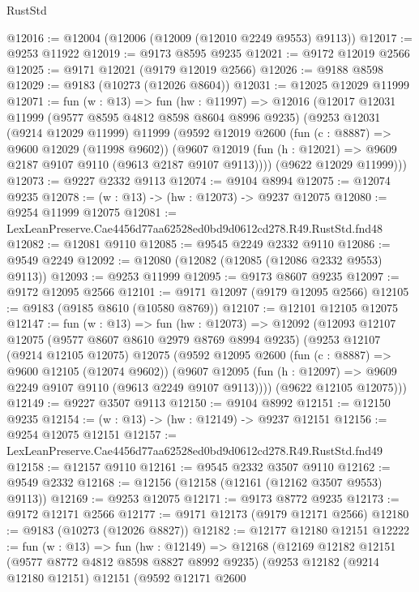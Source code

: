 \begin{lexlean}{RustStd}
\begin{coremodule}
@12016 := @12004 (@12006 (@12009 (@12010 @2249 @9553) @9113))
@12017 := @9253 @11922
@12019 := @9173 @8595 @9235
@12021 := @9172 @12019 @2566
@12025 := @9171 @12021 (@9179 @12019 @2566)
@12026 := @9188 @8598
@12029 := @9183 (@10273 (@12026 @8604))
@12031 := @12025 @12029 @11999
@12071 := fun (w : @13) =>
  fun (hw : @11997) =>
  @12016
    (@12017
      @12031
      @11999
      (@9577 @8595 @4812 @8598 @8604 @8996 @9235)
      (@9253
        @12031
        (@9214 @12029 @11999)
        @11999
        (@9592
          @12019
          @2600
          (fun (c : @8887) => @9600 @12029 (@11998 @9602))
          (@9607 @12019 (fun (h : @12021) => @9609 @2187 @9107 @9110 (@9613 @2187 @9107 @9113))))
        (@9622 @12029 @11999)))
@12073 := @9227 @2332 @9113
@12074 := @9104 @8994
@12075 := @12074 @9235
@12078 := (w : @13) -> (hw : @12073) -> @9237 @12075
@12080 := @9254 @11999 @12075
@12081 := LexLeanPreserve.Cae4456d77aa62528ed0bd9d0612cd278.R49.RustStd.fnd48
@12082 := @12081 @9110
@12085 := @9545 @2249 @2332 @9110
@12086 := @9549 @2249
@12092 := @12080 (@12082 (@12085 (@12086 @2332 @9553) @9113))
@12093 := @9253 @11999
@12095 := @9173 @8607 @9235
@12097 := @9172 @12095 @2566
@12101 := @9171 @12097 (@9179 @12095 @2566)
@12105 := @9183 (@9185 @8610 (@10580 @8769))
@12107 := @12101 @12105 @12075
@12147 := fun (w : @13) =>
  fun (hw : @12073) =>
  @12092
    (@12093
      @12107
      @12075
      (@9577 @8607 @8610 @2979 @8769 @8994 @9235)
      (@9253
        @12107
        (@9214 @12105 @12075)
        @12075
        (@9592
          @12095
          @2600
          (fun (c : @8887) => @9600 @12105 (@12074 @9602))
          (@9607 @12095 (fun (h : @12097) => @9609 @2249 @9107 @9110 (@9613 @2249 @9107 @9113))))
        (@9622 @12105 @12075)))
@12149 := @9227 @3507 @9113
@12150 := @9104 @8992
@12151 := @12150 @9235
@12154 := (w : @13) -> (hw : @12149) -> @9237 @12151
@12156 := @9254 @12075 @12151
@12157 := LexLeanPreserve.Cae4456d77aa62528ed0bd9d0612cd278.R49.RustStd.fnd49
@12158 := @12157 @9110
@12161 := @9545 @2332 @3507 @9110
@12162 := @9549 @2332
@12168 := @12156 (@12158 (@12161 (@12162 @3507 @9553) @9113))
@12169 := @9253 @12075
@12171 := @9173 @8772 @9235
@12173 := @9172 @12171 @2566
@12177 := @9171 @12173 (@9179 @12171 @2566)
@12180 := @9183 (@10273 (@12026 @8827))
@12182 := @12177 @12180 @12151
@12222 := fun (w : @13) =>
  fun (hw : @12149) =>
  @12168
    (@12169
      @12182
      @12151
      (@9577 @8772 @4812 @8598 @8827 @8992 @9235)
      (@9253
        @12182
        (@9214 @12180 @12151)
        @12151
        (@9592
          @12171
          @2600

\end{coremodule}
\end{lexlean}
